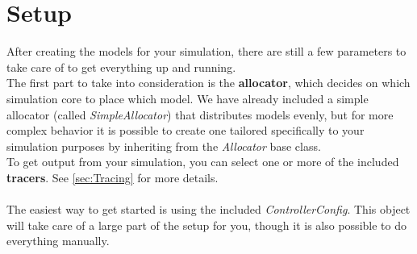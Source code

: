 \section{Setup}

After creating the models for your simulation, there are still a few parameters to take care of to get everything up and running.\\

The first part to take into consideration is the \textbf{allocator}, which decides on which simulation core to place which model. We have already included a simple allocator (called \textsl{SimpleAllocator}) that distributes models evenly, but for more complex behavior it is possible to create one tailored specifically to your simulation purposes by inheriting from the \textsl{Allocator} base class.\\

To get output from your simulation, you can select one or more of the included \textbf{tracers}. See \ref{sec:Tracing} for more details.\\
\\
The easiest way to get started is using the included \textsl{ControllerConfig}. This object will take care of a large part of the setup for you, though it is also possible to do everything manually.\\

